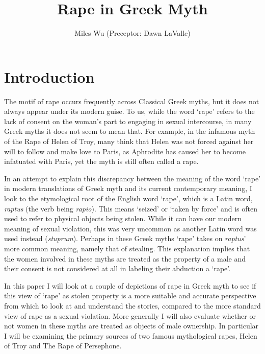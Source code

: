 \documentclass[11pt]{article}
\begin{document}
\title{Rape in Greek Myth}
\author{Miles Wu (Preceptor: Dawn LaValle)}
\maketitle



\newpage

\section{Introduction}
The motif of rape occurs frequently across Classical Greek myths, but it does not always appear under its modern guise.
To us, while the word `rape' refers to the lack of consent on the woman's part to engaging in sexual intercourse, in many Greek myths it does not seem to mean that.
For example, in the infamous myth of the Rape of Helen of Troy, many think that Helen was not  forced against her will to follow and make love to Paris, as Aphrodite has caused her to become infatuated with Paris, yet the myth is still often called a rape.

In an attempt to explain this discrepancy between the meaning of the word `rape' in modern translations of Greek myth and its current contemporary meaning, I look to the etymological root of the English word `rape', which is a Latin word, \emph{raptus} (the verb being \emph{rapio}).
This means `seized' or `taken by force' and is often used to refer to physical objects being stolen.
While it can have our modern meaning of sexual violation, this was very uncommon as another Latin word was used instead (\emph{stuprum}).
Perhaps in these Greek myths `rape' takes on \emph{raptus}' more common meaning, namely that of stealing.
This explanation implies that the women involved in these myths are treated as the property of a male and their consent is not considered at all in labeling their abduction a `rape'.

In this paper I will look at a couple of depictions of rape in Greek myth to see if this view of `rape' as stolen property is a more suitable and accurate perspective from which to look at and understand the stories, compared to the more standard view of rape as a sexual violation.
More generally I will also evaluate whether or not women in these myths are treated as objects of male ownership.
In particular I will be examining the primary sources of two famous mythological rapes, Helen of Troy and The Rape of Persephone.
\end{document}
